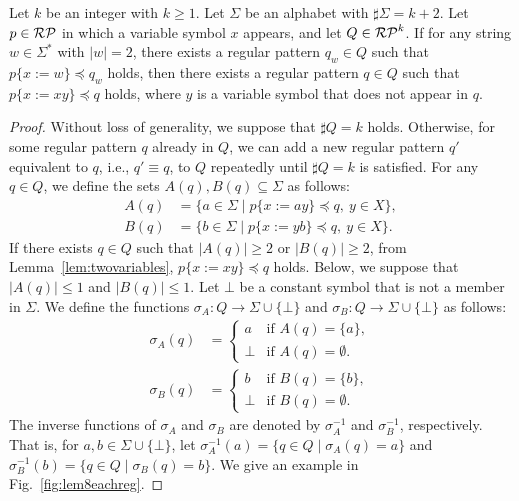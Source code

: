 \begin{lem}\label{追加補題1}
Let $k$ be an integer with $k\geq 1$.
Let $\Sigma$ be an alphabet with $\sharp \Sigma = k + 2$.
Let $p \in \mathcal{RP}$ in which a variable symbol $x$ appears, and let $Q \in \mathcal{RP}^{k}$.
If for any string $w \in \Sigma^{\ast}$ with $|w|=2$, there exists a regular pattern $q_{w} \in Q$ such that $p \{ x:=w \} \preceq q_{w}$ holds, then there exists a regular pattern $q \in Q$ such that $p \{ x:=xy \} \preceq q$ holds, where $y$ is a variable symbol that does not appear in $q$.
\end{lem}

\begin{proof}
Without loss of generality, we suppose that $\sharp Q = k$ holds. Otherwise, for some regular pattern $q$ already in $Q$, we can add a new regular pattern $q'$ equivalent to $q$, i.e., $q' \equiv q$, to $Q$ repeatedly until $\sharp Q = k$ is satisfied.
For any $q \in Q$, we define the sets $A(q), B(q) \subseteq \Sigma$ as follows:
\begin{align*}
  A(q) & = \{ a \in \Sigma \mid p \{ x:=ay \} \preceq q,\ y\in X\},\\ 
  B(q) & = \{ b \in \Sigma \mid p \{ x:=yb \} \preceq q,\ y\in X\}.
  \end{align*}
If there exists $q\in Q$ such that $|A(q)|\geq 2$ or $|B(q)|\geq 2$, from Lemma~\ref{lem:twovariables}, $p\{x := xy\} \preceq q$ holds.
Below, we suppose that $|A(q)|\leq 1$ and $|B(q)|\leq 1$.
Let $\bot$ be a constant symbol that is not a member in $\Sigma$.
We define the functions $\sigma_{A}: Q \rightarrow \Sigma \cup \{\bot\}$ and $\sigma_{B}: Q \rightarrow \Sigma \cup \{\bot\}$ as follows:
\begin{align*}
  \sigma_{A}(q) & =
  \begin{cases}
    a & \textrm{if } A(q) = \{a\}, \\
    \bot & \textrm{if } A(q) = \emptyset.
  \end{cases}\\
  \sigma_{B}(q) & =
  \begin{cases}
    b & \textrm{if } B(q) = \{b\}, \\
    \bot & \textrm{if } B(q) = \emptyset.
  \end{cases}
\end{align*}
The inverse functions of $\sigma_{A}$ and $\sigma_{B}$ are denoted by $\sigma_{A}^{-1}$ and $\sigma_{B}^{-1}$, respectively. That is, for $a,b \in \Sigma \cup \{\bot\}$, let $\sigma_{A}^{-1}(a) = \{q \in Q \mid \sigma_{A}(q) = a\}$ and $\sigma_{B}^{-1}(b) = \{q \in Q \mid \sigma_{B}(q) = b\}$. 
We give an example in Fig.~\ref{fig:lem8eachreg}.


\end{proof}
